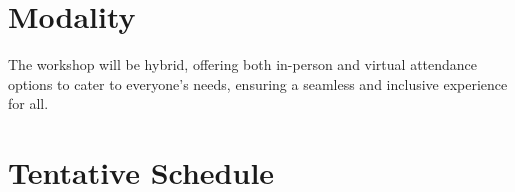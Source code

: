 \documentclass[10pt]{article} %
\begin{document}
\section{Modality}
The workshop will be hybrid, offering both in-person and virtual attendance options to cater to everyone's needs, ensuring a seamless and inclusive experience for all.

\section{Tentative Schedule}







% 
% 

\end{document}

